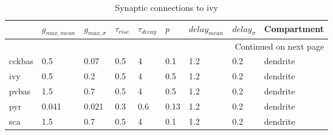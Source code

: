 \begin{longtable}{lllllllll}
\caption{Synaptic connections to ivy}\label{ivy_synapses}\\
\toprule
{} &   $g_{max, mean}$ & $g_{max, \sigma}$ & $\tau_{rise}$ & $\tau_{decay}$ &  $p$ & $delay_{mean}$ & $delay_{\sigma}$ & Compartment \\
\midrule
\endhead
\midrule
\multicolumn{9}{r}{{Continued on next page}} \\
\midrule
\endfoot

\bottomrule
\endlastfoot
cckbas &    0.5 &     0.07 &      0.5 &         4 &   0.1 &   1.2 &       0.2 &      dendrite\ \\
ivy    &    0.5 &      0.2 &      0.5 &         4 &   0.5 &   1.2 &       0.2 &      dendrite\ \\
pvbas  &    1.5 &      0.7 &      0.5 &         4 &   0.5 &   1.2 &       0.2 &      dendrite\ \\
pyr    &  0.041 &    0.021 &      0.3 &       0.6 &  0.13 &   1.2 &       0.2 &      dendrite\ \\
sca    &    1.5 &      0.7 &      0.5 &         4 &   0.1 &   1.2 &       0.2 &      dendrite\ \\
\end{longtable}
